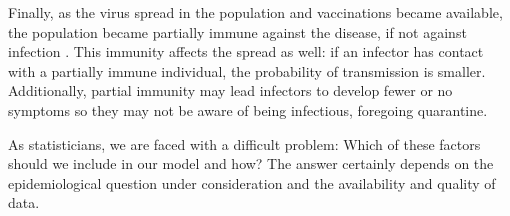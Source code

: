 Finally, as the virus spread in the population and vaccinations became available, the population became partially immune against the disease, if not against infection . This immunity affects the spread as well: if an infector has contact with a partially immune individual, the probability of transmission is smaller. Additionally, partial immunity may lead infectors to develop fewer or no symptoms so they may not be aware of being infectious, foregoing quarantine.

As statisticians, we are faced with a difficult problem: Which of these factors should we include in our model and how? The answer certainly depends on the epidemiological question under consideration and the availability and quality of data. 





